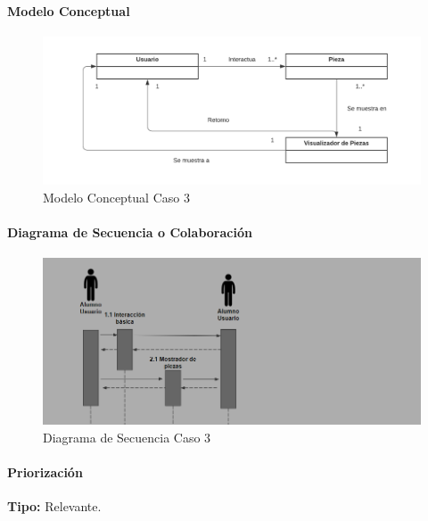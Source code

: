 \paragraph{Modelo Conceptual}

\begin{figure}[H]
\centerline{\includegraphics[width=15cm]{imgs/ModeloConceptualCaso_3_3.png}}
\caption{Modelo Conceptual Caso 3}
\label{fig_3_2}
\end{figure}


\paragraph{Diagrama de Secuencia o Colaboración}

\begin{figure}[H]
\centerline{\includegraphics[width=15cm]{imgs/CasoUso_3_2.PNG}}
\caption{Diagrama de Secuencia Caso 3}
\label{fig_3_3}
\end{figure}

\paragraph{Priorización}
{\textbf {Tipo:}}
Relevante.